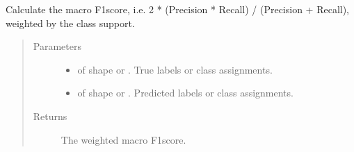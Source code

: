 \documentclass[letterpaper,10pt,english]{sphinxmanual}
\begin{document}
\begin{fulllineitems}
\label{\detokenize{pusion.evaluation.evaluation_metrics:pusion.evaluation.evaluation_metrics.weighted_f1}}
\sphinxAtStartPar
Calculate the macro F1\sphinxhyphen{}score, i.e. 2 * (Precision * Recall) / (Precision + Recall), weighted by the class support.
\begin{quote}\begin{description}
\item[{Parameters}] \leavevmode\begin{itemize}
\item {} 
\sphinxAtStartPar
{} \textendash{}  of shape  or . True labels or class assignments.

\item {} 
\sphinxAtStartPar
{} \textendash{}  of shape  or . Predicted labels or
class assignments.

\end{itemize}

\item[{Returns}] \leavevmode
\sphinxAtStartPar
The weighted macro F1\sphinxhyphen{}score.

\end{description}\end{quote}

\end{fulllineitems}

\end{document}
